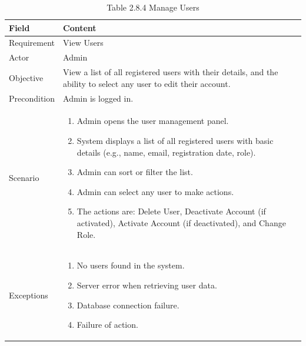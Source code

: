 \documentclass[12pt,oneside]{report}
\begin{document}
\begin{table}[H]
\centering
\caption{Table 2.8.4 Manage Users}
\label{tab:admin-manage-users}
\begin{tabularx}{\textwidth}{|p{3cm}|X|}
\hline
\textbf{Field} & \textbf{Content} \\ \hline

Requirement & View Users \\ \hline

Actor & Admin \\ \hline

Objective & View a list of all registered users with their details, and the ability to select any user to edit their account. \\ \hline

Precondition & Admin is logged in. \\ \hline

Scenario & 
\begin{minipage}[t]{0.75\textwidth}
\begin{enumerate}[leftmargin=*,label=\arabic*.]
\item Admin opens the user management panel.
\item System displays a list of all registered users with basic details (e.g., name, email, registration date, role).
\item Admin can sort or filter the list.
\item Admin can select any user to make actions.
\item The actions are: Delete User, Deactivate Account (if activated), Activate Account (if deactivated), and Change Role.
\end{enumerate}
\end{minipage} \\ \hline

Exceptions &
\begin{minipage}[t]{0.75\textwidth}
\begin{enumerate}[leftmargin=*,label=\arabic*.]
\item No users found in the system.
\item Server error when retrieving user data.
\item Database connection failure.
\item Failure of action.
\end{enumerate}
\end{minipage} \\ \hline

\end{tabularx}
\end{table}
\end{document}
